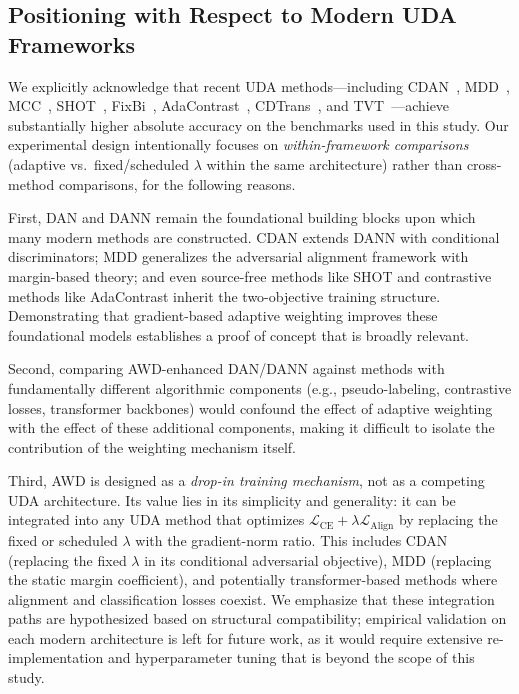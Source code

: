 \documentclass[pdflatex,sn-mathphys-num]{sn-jnl}
\theoremstyle{thmstyleone}
\theoremstyle{thmstyletwo}
\theoremstyle{thmstylethree}
\begin{document}
\subsection{Positioning with Respect to Modern UDA Frameworks}
\label{sec:positioning}

We explicitly acknowledge that recent UDA methods---including CDAN~\cite{long2018cdan}, MDD~\cite{zhang2019mdd}, MCC~\cite{jin2020mcc}, SHOT~\cite{liang2020shot}, FixBi~\cite{na2021fixbi}, AdaContrast~\cite{chen2022contrastive}, CDTrans~\cite{xu2022cdtrans}, and TVT~\cite{yang2023tvt}---achieve substantially higher absolute accuracy on the benchmarks used in this study. Our experimental design intentionally focuses on \emph{within-framework comparisons} (adaptive vs.\ fixed/scheduled $\lambda$ within the same architecture) rather than cross-method comparisons, for the following reasons.

First, DAN and DANN remain the foundational building blocks upon which many modern methods are constructed. CDAN extends DANN with conditional discriminators; MDD generalizes the adversarial alignment framework with margin-based theory; and even source-free methods like SHOT and contrastive methods like AdaContrast inherit the two-objective training structure. Demonstrating that gradient-based adaptive weighting improves these foundational models establishes a proof of concept that is broadly relevant.

Second, comparing AWD-enhanced DAN/DANN against methods with fundamentally different algorithmic components (e.g., pseudo-labeling, contrastive losses, transformer backbones) would confound the effect of adaptive weighting with the effect of these additional components, making it difficult to isolate the contribution of the weighting mechanism itself.

Third, AWD is designed as a \emph{drop-in training mechanism}, not as a competing UDA architecture. Its value lies in its simplicity and generality: it can be integrated into any UDA method that optimizes $\mathcal{L}_{\text{CE}} + \lambda \mathcal{L}_{\text{Align}}$ by replacing the fixed or scheduled $\lambda$ with the gradient-norm ratio. This includes CDAN (replacing the fixed $\lambda$ in its conditional adversarial objective), MDD (replacing the static margin coefficient), and potentially transformer-based methods where alignment and classification losses coexist. We emphasize that these integration paths are hypothesized based on structural compatibility; empirical validation on each modern architecture is left for future work, as it would require extensive re-implementation and hyperparameter tuning that is beyond the scope of this study. 
\end{document}
